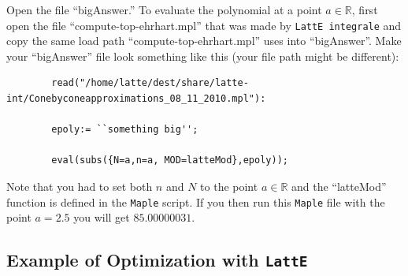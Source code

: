\documentclass{article}
\newcommand{\R}{{\mathbb R}}
\newcommand{\latte}{{\tt LattE}\xspace}
\newcommand{\latteInt}{{\tt LattE integrale}\xspace}
\newcommand{\maple}{{\tt Maple}\xspace}
\begin{document}
Open the file ``bigAnswer.'' To evaluate the polynomial at a point $a \in \R$, first open the file ``compute-top-ehrhart.mpl'' that was made by \latteInt and copy the same load path ``compute-top-ehrhart.mpl'' uses into ``bigAnswer''. Make your ``bigAnswer'' file look something like this (your file path might be different):

        \begin{verbatim}
        read("/home/latte/dest/share/latte-int/Conebyconeapproximations_08_11_2010.mpl"):
        
        epoly:= ``something big'';
        
        eval(subs({N=a,n=a, MOD=latteMod},epoly));
        \end{verbatim}
Note that you had to set both $n$ and $N$ to the point $a \in \R$ and the ``latteMod'' function is defined in the \maple script. If you then run this \maple file with the point $a=2.5$ you will get $85.00000031$.

\subsection{Example of Optimization with \latte}
\end{document}
